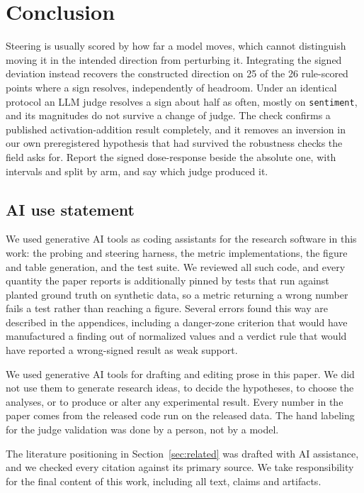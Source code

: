 \documentclass{article}
\begin{document}
\section{Conclusion}

Steering is usually scored by how far a model moves, which cannot distinguish
moving it in the intended direction from perturbing it. Integrating the signed
deviation instead recovers the constructed direction on 25 of the 26 rule-scored
points where a sign resolves, independently of headroom. Under an identical
protocol an LLM judge resolves a sign about half as often, mostly on
\texttt{sentiment}, and its magnitudes do not survive a change of
judge. The check confirms a published activation-addition result completely,
and it removes an inversion in our own preregistered hypothesis that had
survived the robustness checks the field asks for. Report the signed
dose-response beside the absolute one, with intervals and split by arm, and say
which judge produced it.

\subsection*{AI use statement}

We used generative AI tools as coding assistants for the research software in
this work: the probing and steering harness, the metric implementations, the
figure and table generation, and the test suite. We reviewed all such code, and
every quantity the paper reports is additionally pinned by
tests that run against planted ground truth on synthetic data, so a metric
returning a wrong number fails a test rather than reaching a figure. Several
errors found this way are described in the appendices, including a
danger-zone criterion that would have manufactured a finding out of normalized
values and a verdict rule that would have reported a wrong-signed result as
weak support.

We used generative AI tools for drafting and editing prose in this paper. We
did not use them to generate research ideas, to decide the hypotheses, to
choose the analyses, or to produce or alter any experimental result. Every
number in the paper comes from the released code run on the released data.
The hand labeling for the judge validation was done by a person, not by a model.

The literature positioning in Section~\ref{sec:related} was drafted with AI
assistance, and we checked every citation against its primary source. We take responsibility for the final content of this work, including
all text, claims and artifacts.
\end{document}
